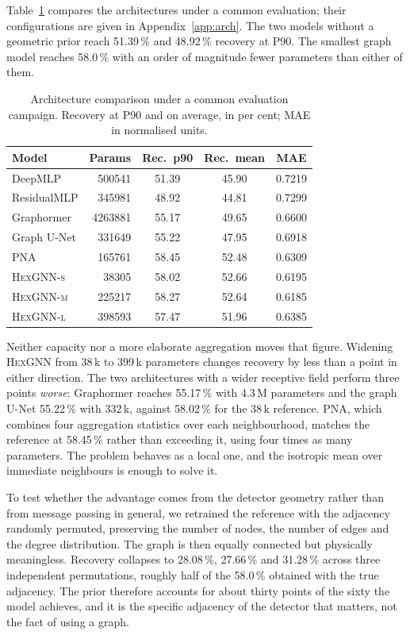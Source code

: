 \documentclass[10pt,conference]{IEEEtran}
\begin{document}
Table~\ref{tab:architectures} compares the architectures under a common
evaluation; their configurations are given in Appendix~\ref{app:arch}. The two models without a geometric prior reach 51.39\,\% and
48.92\,\% recovery at P90. The smallest graph model reaches
58.0\,\% with an order of magnitude fewer parameters than either of them.

\begin{table}[t]
\centering
\caption{Architecture comparison under a common evaluation campaign. Recovery
at P90 and on average, in per cent; MAE in normalised units.}
\label{tab:architectures}
\begin{tabular}{@{}lrccc@{}}
\toprule
\textbf{Model} & \textbf{Params} & \textbf{Rec.\ p90} & \textbf{Rec.\ mean} & \textbf{MAE} \\
\midrule
DeepMLP           & \num{500541}  & 51.39 & 45.90 & 0.7219 \\
ResidualMLP       & \num{345981}  & 48.92 & 44.81 & 0.7299 \\
Graphormer        & \num{4263881} & 55.17 & 49.65 & 0.6600 \\
Graph U-Net       & \num{331649}  & 55.22 & 47.95 & 0.6918 \\
PNA               & \num{165761}  & 58.45 & 52.48 & 0.6309 \\
\textsc{HexGNN-s} & \num{38305}   & 58.02 & 52.66 & 0.6195 \\
\textsc{HexGNN-m} & \num{225217}  & 58.27 & 52.64 & 0.6185 \\
\textsc{HexGNN-l} & \num{398593}  & 57.47 & 51.96 & 0.6385 \\
\bottomrule
\end{tabular}
\end{table}
Neither capacity nor a more elaborate aggregation moves that figure. Widening
\textsc{HexGNN} from 38\,k to 399\,k parameters changes recovery by less than a
point in either direction. The two architectures with a wider receptive field
perform three points \emph{worse}: Graphormer reaches 55.17\,\% with 4.3\,M
parameters and the graph U-Net 55.22\,\% with 332\,k, against 58.02\,\% for the
38\,k reference. PNA, which combines four aggregation statistics over each
neighbourhood, matches the reference at 58.45\,\% rather than exceeding it, using
four times as many parameters. The problem behaves as a local
one, and the isotropic mean over immediate neighbours is enough to solve it.

To test whether the advantage comes from the detector geometry rather than from
message passing in general, we retrained the reference with the adjacency
randomly permuted, preserving the number of nodes, the number of edges and the
degree distribution. The graph is then equally connected but physically
meaningless. Recovery collapses to 28.08\,\%, 27.66\,\% and 31.28\,\% across three
independent permutations, roughly half of the 58.0\,\% obtained with the true
adjacency. The prior therefore accounts for about thirty points of the sixty
the model achieves, and it is the specific adjacency of the detector that
matters, not the fact of using a graph.
\end{document}
